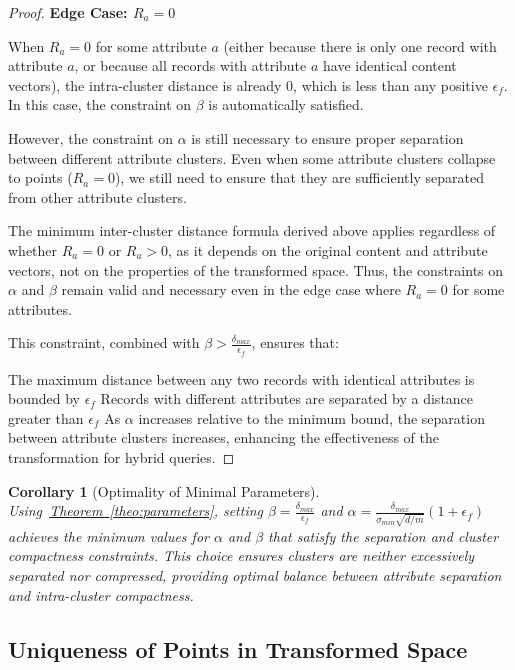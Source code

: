 \documentclass[numbers,sort]{article}
\newtheorem{corollary}{Corollary}
\begin{document}
\begin{proof}
\textbf{Edge Case: $R_a = 0$}

When $R_a = 0$ for some attribute $a$ (either because there is only one record with attribute $a$, or because all records with attribute $a$ have identical content vectors), the intra-cluster distance is already 0, which is less than any positive $\epsilon_f$. In this case, the constraint on $\beta$ is automatically satisfied.

However, the constraint on $\alpha$ is still necessary to ensure proper separation between different attribute clusters. Even when some attribute clusters collapse to points ($R_a = 0$), we still need to ensure that they are sufficiently separated from other attribute clusters.

The minimum inter-cluster distance formula derived above applies regardless of whether $R_a = 0$ or $R_a > 0$, as it depends on the original content and attribute vectors, not on the properties of the transformed space. Thus, the constraints on $\alpha$ and $\beta$ remain valid and necessary even in the edge case where $R_a = 0$ for some attributes.

This constraint, combined with $\beta > \frac{\delta_{max}}{\epsilon_f}$, ensures that:

The maximum distance between any two records with identical attributes is bounded by $\epsilon_f$
Records with different attributes are separated by a distance greater than $\epsilon_f$
As $\alpha$ increases relative to the minimum bound, the separation between attribute clusters increases, enhancing the effectiveness of the transformation for hybrid queries.
\end{proof}

\begin{corollary}[Optimality of Minimal Parameters]
\label{cor:optimality}
    Using~\hyperref[theo:parameters]{Theorem~\ref*{theo:parameters}}, setting $\beta = \frac{\delta_{max}}{\epsilon_f}$ and $\alpha = \frac{\delta_{max}}{\sigma_{min}\sqrt{d/m}} \left(1 + \epsilon_f \right)$ achieves the minimum values for $\alpha$ and $\beta$ that satisfy the separation and cluster compactness constraints. This choice ensures clusters are neither excessively separated nor compressed, providing optimal balance between attribute separation and intra-cluster compactness.
\end{corollary}

\subsection{Uniqueness of Points in Transformed Space}
\end{document}

